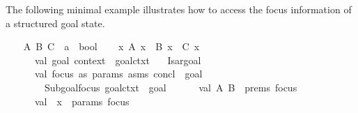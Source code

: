 \begin{isabellebody}
\begin{isamarkuptext}
\begin{description}
  \end{description}%
\end{isamarkuptext}%
\isamarkuptrue%
%
\endisatagmlref
{\isafoldmlref}%
%
\isadelimmlref
%
\endisadelimmlref
%
\isadelimmlex
%
\endisadelimmlex
%
\isatagmlex
%
\begin{isamarkuptext}%
The following minimal example illustrates how to access
  the focus information of a structured goal state.%
\end{isamarkuptext}%
\isamarkuptrue%
%
\endisatagmlex
{\isafoldmlex}%
%
\isadelimmlex
%
\endisadelimmlex
{}\isamarkupfalse%
\isanewline
%
\isadelimproof
\ \ %
\endisadelimproof
%
\isatagproof
{}\isamarkupfalse%
\ A\ B\ C\ {\isacharcolon}{\isacharcolon}\ {\isachardoublequoteopen}{\isacharprime}a\ {\isasymRightarrow}\ bool{\isachardoublequoteclose}\isanewline
\isanewline
\ \ \isamarkupfalse%
\ {\isachardoublequoteopen}{\isasymAnd}x{\isachardot}\ A\ x\ {\isasymLongrightarrow}\ B\ x\ {\isasymLongrightarrow}\ C\ x{\isachardoublequoteclose}%
\endisatagproof
{\isafoldproof}%
%
\isadelimproof
\isanewline
%
\endisadelimproof
%
\isadelimML
\ \ \ \ %
\endisadelimML
%
\isatagML
{}\isamarkupfalse%
\isanewline
\ \ \ \ {\isacharverbatimopen}\isanewline
\ \ \ \ \ \ val\ {\isacharbraceleft}goal{\isacharcomma}\ context\ {\isacharequal}\ goal{\isacharunderscore}ctxt{\isacharcomma}\ {\isachardot}{\isachardot}{\isachardot}{\isacharbraceright}\ {\isacharequal}\ %
\isaantiq
Isar{\isachardot}goal%
\endisaantiq
{\isacharsemicolon}\isanewline
\ \ \ \ \ \ val\ {\isacharparenleft}focus\ as\ {\isacharbraceleft}params{\isacharcomma}\ asms{\isacharcomma}\ concl{\isacharcomma}\ {\isachardot}{\isachardot}{\isachardot}{\isacharbraceright}{\isacharcomma}\ goal{\isacharprime}{\isacharparenright}\ {\isacharequal}\isanewline
\ \ \ \ \ \ \ \ Subgoal{\isachardot}focus\ goal{\isacharunderscore}ctxt\ {}\ goal{\isacharsemicolon}\isanewline
\ \ \ \ \ \ val\ {\isacharbrackleft}A{\isacharcomma}\ B{\isacharbrackright}\ {\isacharequal}\ {\isacharhash}prems\ focus{\isacharsemicolon}\isanewline
\ \ \ \ \ \ val\ {\isacharbrackleft}{\isacharparenleft}{\isacharunderscore}{\isacharcomma}\ x{\isacharparenright}{\isacharbrackright}\ {\isacharequal}\ {\isacharhash}params\ focus{\isacharsemicolon}\isanewline
\ \ \ \ {\isacharverbatimclose}%
\endisatagML
{\isafoldML}%
%
\isadelimML
\isanewline
%
\endisadelimML
%
\isadelimproof
\ \ \ \ %
\endisadelimproof
%
\isatagproof
{}\isamarkupfalse%
%
\endisatagproof
{\isafoldproof}%

\end{isabellebody}
